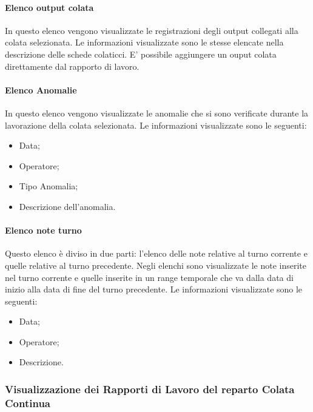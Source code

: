   \paragraph{Elenco output colata}
  In questo elenco vengono visualizzate le registrazioni degli output collegati alla colata selezionata. 
  Le informazioni visualizzate sono le stesse elencate 
  nella descrizione delle schede colaticci. E' possibile aggiungere un ouput colata direttamente dal 
  rapporto di lavoro.
  
  \paragraph{Elenco Anomalie}
  In questo elenco vengono visualizzate le anomalie che si sono verificate durante la lavorazione della colata 
  selezionata. Le informazioni visualizzate sono le seguenti:
  \begin{itemize}
    \item Data;
    \item Operatore;
    \item Tipo Anomalia;
    \item Descrizione dell'anomalia.
  \end{itemize} 
  
  \paragraph{Elenco note turno}
  Questo elenco è diviso in due parti: l'elenco delle note relative al turno corrente e quelle relative al 
  turno precedente. Negli elenchi sono visualizzate le note inserite nel turno corrente e quelle inserite 
  in un range temporale che va dalla data di inizio alla data di fine del turno precedente. 
  Le informazioni visualizzate sono le seguenti:
  \begin{itemize}
    \item Data;
    \item Operatore;
    \item Descrizione.
  \end{itemize}   

  \subsubsection{Visualizzazione dei Rapporti di Lavoro del reparto Colata Continua}
